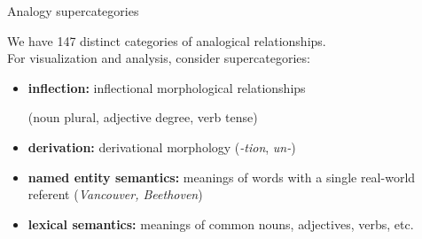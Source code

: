 \documentclass{beamer}
\begin{document}
\begin{frame}{Analogy supercategories}

We have 147 distinct categories of analogical relationships. \\
For visualization and analysis, consider supercategories:
\begin{itemize}
\item \textbf{inflection:} inflectional morphological relationships

(noun plural, adjective degree, verb tense)
\item \textbf{derivation:} derivational morphology (\emph{-tion}, \emph{un-})
\item \textbf{named entity semantics:} meanings of words with a single real-world referent (\emph{Vancouver, Beethoven})
\item \textbf{lexical semantics:} meanings of common nouns, adjectives, verbs, etc.
\end{itemize}

\end{frame}
\end{document}
